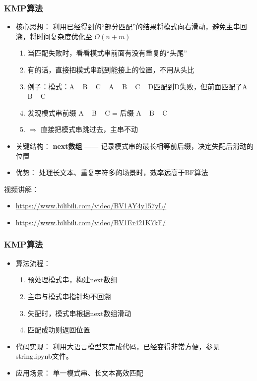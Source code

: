 \begin{frame}
  \frametitle{KMP算法}
  \begin{itemize}
  \item 核心思想：
    利用已经得到的“部分匹配”的结果将模式向右滑动，避免主串回溯，将时间复杂度优化至 $O(n+m)$

    \begin{enumerate}
    \item 当匹配失败时，看看模式串前面有没有重复的“头尾”
    \item 有的话，直接把模式串跳到能接上的位置，不用从头比
    \item 例子：模式：A ~ B ~ C ~ A ~ B ~ C ~ D匹配到D失败，但前面匹配了A ~ B ~ C
    \item 发现模式串前缀 A ~ B ~ C = 后缀 A ~ B ~ C
    \item $\Rightarrow$ 直接把模式串跳过去，主串不动
    \end{enumerate}

  \item 关键结构：
    \textbf{next数组} —— 记录模式串的最长相等前后缀，决定失配后滑动的位置
  \item 优势：
    处理长文本、重复字符多的场景时，效率远高于BF算法
  \end{itemize}

  \newpage

  视频讲解：
  \begin{itemize}
    \item \url{https://www.bilibili.com/video/BV1AY4y157yL/}
    \item \url{https://www.bilibili.com/video/BV1Er421K7kF/}
  \end{itemize}
\end{frame}

\begin{frame}[fragile]
  \frametitle{KMP算法}
  \begin{itemize}
  \item 算法流程：
    \begin{enumerate}
    \item 预处理模式串，构建next数组
    \item 主串与模式串指针均不回溯
    \item 失配时，模式串根据next数组滑动
    \item 匹配成功则返回位置
    \end{enumerate}
  \item 代码实现：
    利用大语言模型来完成代码，已经变得非常方便，参见string.ipynb文件。
  \item 应用场景：
    单一模式串、长文本高效匹配
  \end{itemize}
\end{frame}

